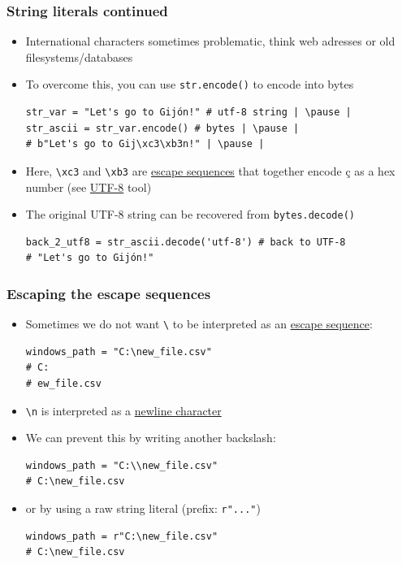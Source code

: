 \documentclass[xcolor=table]{beamer}
\begin{document}
\begin{frame}[fragile]
    \frametitle{String literals continued}
\begin{itemize}
    \item International characters sometimes problematic, think web adresses or old filesystems/databases
        \pause
    \item To overcome this, you can use \texttt{str.encode()} to encode into bytes
\begin{lstlisting}[style=python,belowskip=-1.5\baselineskip]
str_var = "Let's go to Gijón!" # utf-8 string | \pause |
str_ascii = str_var.encode() # bytes | \pause |
# b"Let's go to Gij\xc3\xb3n!" | \pause |
\end{lstlisting}
    \item Here, \texttt{\textbackslash xc3} and \texttt{\textbackslash xb3} are \href{https://docs.python.org/3/reference/lexical_analysis.html#grammar-token-stringescapeseq}{escape sequences} that together encode \c{c} as a hex number (see \href{http://www.ltg.ed.ac.uk/~richard/utf-8.cgi?input=&mode=char}{UTF-8} tool) 
        \pause
    \item The original UTF-8 string can be recovered from \texttt{bytes.decode()}
\begin{lstlisting}[style=python]
back_2_utf8 = str_ascii.decode('utf-8') # back to UTF-8
# "Let's go to Gijón!"
\end{lstlisting}
\end{itemize}
\end{frame}

\begin{frame}[fragile]
    \frametitle{Escaping the escape sequences}
\begin{itemize}
    \item Sometimes we do not want \texttt{\textbackslash} to be interpreted as an \href{https://docs.python.org/3/reference/lexical_analysis.html#grammar-token-stringescapeseq}{escape sequence}:
\begin{lstlisting}[style=python,belowskip=-1 \baselineskip] 
windows_path = "C:\new_file.csv"
# C:
# ew_file.csv
\end{lstlisting}
        \pause
\item \texttt{\textbackslash n} is interpreted as a \href{https://en.wikipedia.org/wiki/Newline}{newline character}
    \pause
\item We can prevent this by writing another backslash:
\begin{lstlisting}[style=python,belowskip=-1 \baselineskip]
windows_path = "C:\\new_file.csv"
# C:\new_file.csv
\end{lstlisting} \pause
\item or by using a raw string literal (prefix: \texttt{r"..."})
\begin{lstlisting}[style=python]
windows_path = r"C:\new_file.csv"
# C:\new_file.csv
\end{lstlisting}
\end{itemize}
\end{frame}
\end{document}
